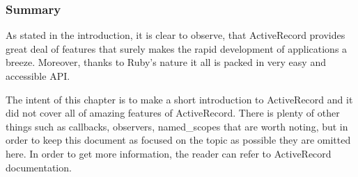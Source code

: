       \subsubsection{Summary}
      As stated in the introduction, it is clear to observe, that ActiveRecord provides great deal
      of features that surely makes the rapid development of applications a breeze. Moreover, thanks
      to Ruby's nature it all is packed in very easy and accessible API.
      
      The intent of this chapter is to make a short introduction to ActiveRecord and it did not cover 
      all of amazing features of ActiveRecord. There is plenty of other things such as callbacks, 
      observers, named\_scopes that are worth noting, but in order to keep 
      this document as focused on the topic as possible they are omitted here. In order to get more 
      information, the reader can refer to ActiveRecord documentation.